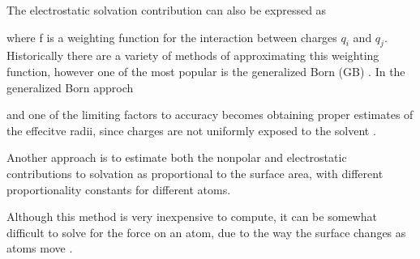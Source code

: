 The electrostatic solvation contribution can also be expressed as

where f is a weighting function for the interaction between charges $q_i$ and $q_j$.
Historically there are a variety of methods of approximating this weighting function, however one of the most popular is the generalized Born (GB) \cite{still1990semianalytical}.
In the generalized Born approch

and one of the limiting factors to accuracy becomes obtaining proper estimates of the effecitve radii, since charges are not uniformly exposed to the solvent \cite{schaefer1996comprehensive}.

Another approach is to estimate both the nonpolar and electrostatic contributions to solvation as proportional to the surface area, with different proportionality constants for different atoms.

Although this method is very inexpensive to compute, it can be somewhat difficult to solve for the force on an atom, due to the way the surface changes as atoms move \cite{roux1999implicit}.
